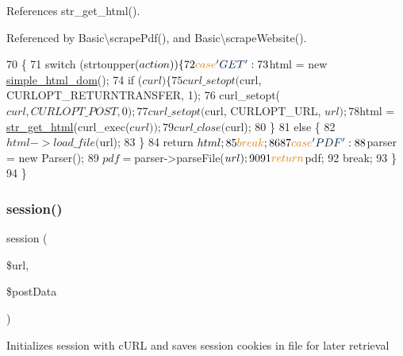 References str\+\_\+get\+\_\+html().



Referenced by Basic\textbackslash{}scrape\+Pdf(), and Basic\textbackslash{}scrape\+Website().


\begin{DoxyCode}
70                                                            \{
71         \textcolor{keywordflow}{switch} (strtoupper($action)) \{
72             \textcolor{keywordflow}{case} \textcolor{stringliteral}{'GET'}:
73             $html = \textcolor{keyword}{new} \hyperlink{classsimple__html__dom}{simple\_html\_dom}();
74             \textcolor{keywordflow}{if} ($curl) \{
75                 curl\_setopt($curl, CURLOPT\_RETURNTRANSFER, 1); 
76                 curl\_setopt($curl, CURLOPT\_POST, 0);
77                 curl\_setopt($curl, CURLOPT\_URL, $url);
78                 $html = \hyperlink{simple__html__dom_8php_a2a9c7626f0cb0a56eb81709124a08922}{str\_get\_html}(curl\_exec($curl));
79                 curl\_close($curl);
80             \}
81             \textcolor{keywordflow}{else} \{
82                 $html->load\_file($url);
83             \}
84             \textcolor{keywordflow}{return} $html;
85             \textcolor{keywordflow}{break};
86             
87             \textcolor{keywordflow}{case} \textcolor{stringliteral}{'PDF'}:
88             $parser = \textcolor{keyword}{new} Parser();
89             $pdf = $parser->parseFile($url);
90 
91             \textcolor{keywordflow}{return} $pdf;
92             \textcolor{keywordflow}{break};
93         \}
94     \}
\end{DoxyCode}
\hypertarget{class_base_controller_a259a554926fc05640c8c711c340cdeac}{}\label{class_base_controller_a259a554926fc05640c8c711c340cdeac} 
\subsubsection{\texorpdfstring{session()}{session()}}
{\footnotesize\ttfamily session (\begin{DoxyParamCaption}\item[{}]{\$url,  }\item[{}]{\$post\+Data }\end{DoxyParamCaption})\hspace{0.3cm}{\ttfamily [protected]}}

Initializes session with c\+U\+RL and saves session cookies in file for later retrieval


